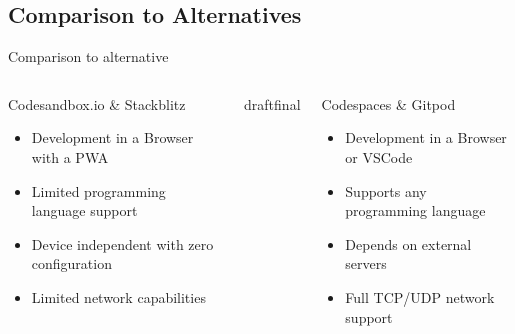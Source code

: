 \documentclass{beamer}
\def\final{final}
\def\status{draft}
\begin{document}
\subsection{Comparison to Alternatives}
\begin{frame}
  \vspace{-.7cm}
  \begin{center}
    \Large Comparison to alternative
  \end{center}
  \vspace{-0.2cm}
  \begin{columns}[totalwidth=\textwidth]
    \begin{column}{0.5\textwidth}
      \begin{center}
        {\large\color{uos-red-full}Codesandbox.io \& Stackblitz}
      \end{center}
      \begin{itemize}
        \setlength\itemsep{0.6em}
        \item Development in a Browser with a PWA
        \item Limited programming language support
        \item Device independent with zero configuration
        \item Limited network capabilities
      \end{itemize}
    \end{column}

    \ifx\status\final{}
      \pause{}
    \fi


    \begin{column}{0.5\textwidth}
      \begin{center}
        {\large\color{uos-red-full}Codespaces \& Gitpod}
      \end{center}
      \begin{itemize}
        \setlength\itemsep{0.6em}
        \item Development in a Browser or VSCode
        \item Supports any programming language
        \item Depends on external servers
        \item Full TCP/UDP network support
      \end{itemize}
    \end{column}
  \end{columns}
\end{frame}
\end{document}
